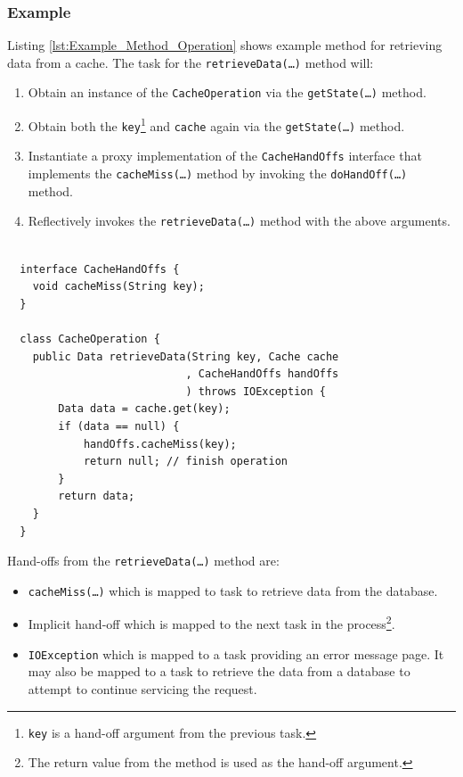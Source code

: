 \documentclass[prodmode]{style/acmlarge}
\begin{document}
\subsubsection*{Example}

Listing \ref{lst:Example_Method_Operation} shows example method for retrieving
data from a cache.  The task for the \texttt{retrieveData(\ldots)} method will:
\begin{enumerate}
  \item Obtain an instance of the \texttt{CacheOperation} via the \texttt{getState(\ldots)} method.
  \item Obtain both the \texttt{key}\footnote{\texttt{key} is a hand-off argument from the previous task.} and \texttt{cache} again via the \texttt{getState(\ldots)} method.
  \item Instantiate a proxy implementation of the \texttt{CacheHandOffs} interface that implements the \texttt{cacheMiss(\ldots)} method by invoking the \texttt{doHandOff(\ldots)} method. 
  \item Reflectively invokes the \texttt{retrieveData(\ldots)} method with the above arguments.
\end{enumerate}

\lstset{caption=Example developer code of a task for retrieving data from a cache\protect\footnotemark}
\begin{lstlisting}[float,label=lst:Example_Method_Operation]

  interface CacheHandOffs {
    void cacheMiss(String key);
  }

  class CacheOperation {    
    public Data retrieveData(String key, Cache cache
                            , CacheHandOffs handOffs
                            ) throws IOException {
        Data data = cache.get(key);
        if (data == null) {
            handOffs.cacheMiss(key);
            return null; // finish operation
        }
        return data;
    }
  }
\end{lstlisting}

Hand-offs from the \texttt{retrieveData(\ldots)} method are:
\begin{itemize}
  \item \texttt{cacheMiss(\ldots)} which is mapped to task to retrieve data from the database.
  \item Implicit hand-off which is mapped to the next task in the process\footnote{The return value from the method is used as the hand-off argument.}.
  \item \texttt{IOException} which is mapped to a task providing an error message page.  It may also be mapped to a task to retrieve the data from a database to attempt to continue servicing the request.
\end{itemize}
\end{document}
